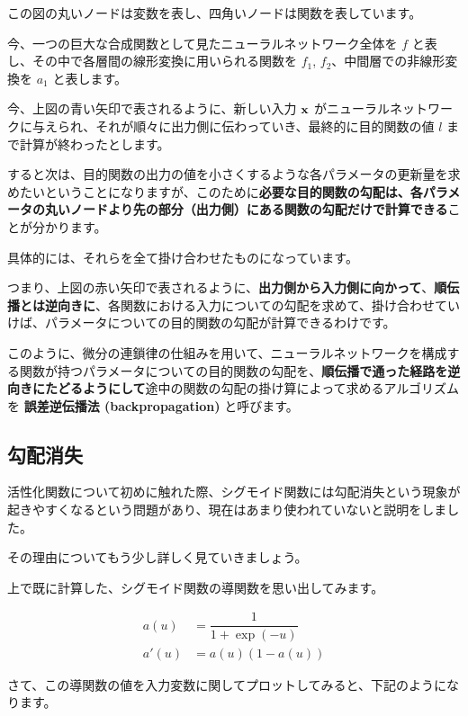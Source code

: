 この図の丸いノードは変数を表し、四角いノードは関数を表しています。


今、一つの巨大な合成関数として見たニューラルネットワーク全体を $f$ と表し、その中で各層間の線形変換に用いられる関数を $f_1$, $f_2$、中間層での非線形変換を $a_1$ と表します。


今、上図の青い矢印で表されるように、新しい入力 ${\bf x}$ がニューラルネットワークに与えられ、それが順々に出力側に伝わっていき、最終的に目的関数の値 $l$ まで計算が終わったとします。


すると次は、目的関数の出力の値を小さくするような各パラメータの更新量を求めたいということになりますが、このために\textbf{必要な目的関数の勾配は、各パラメータの丸いノードより先の部分（出力側）にある関数の勾配だけで計算できる}ことが分かります。

具体的には、それらを全て掛け合わせたものになっています。


つまり、上図の赤い矢印で表されるように、\textbf{出力側から入力側に向かって}、\textbf{順伝播とは逆向きに}、各関数における入力についての勾配を求めて、掛け合わせていけば、パラメータについての目的関数の勾配が計算できるわけです。


このように、微分の連鎖律の仕組みを用いて、ニューラルネットワークを構成する関数が持つパラメータについての目的関数の勾配を、\textbf{順伝播で通った経路を逆向きにたどるようにして}途中の関数の勾配の掛け算によって求めるアルゴリズムを \textbf{誤差逆伝播法 (backpropagation)} と呼びます。


\subsection{勾配消失}


活性化関数について初めに触れた際、シグモイド関数には勾配消失という現象が起きやすくなるという問題があり、現在はあまり使われていないと説明をしました。

その理由についてもう少し詳しく見ていきましょう。


上で既に計算した、シグモイド関数の導関数を思い出してみます。


\[
\begin{aligned}
a\left( u\right) &=\dfrac {1}{1+\exp(-u)} \\
a'\left( u\right) &= a\left( u\right) \left( 1-a\left( u\right) \right)
\end{aligned}
\]


さて、この導関数の値を入力変数に関してプロットしてみると、下記のようになります。




